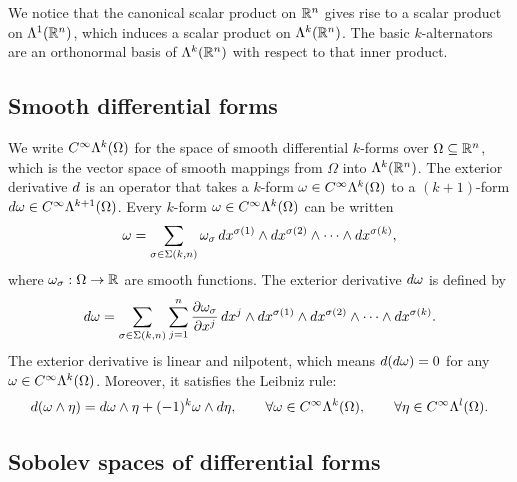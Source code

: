 \documentclass[10pt,a4paper]{article}
\begin{document}
We notice that the canonical scalar product on ${\mathbb R}^{n}$ gives rise to a scalar product on $\Lambda^{1}({\mathbb R}^{n})$,
which induces a scalar product on $\Lambda^{k}({\mathbb R}^{n})$.
The basic $k$-alternators are an orthonormal basis of $\Lambda^{k}({\mathbb R}^{n})$ with respect to that inner product. 

\subsection{Smooth differential forms}

We write $C^{\infty}\Lambda^{k}(\Omega)$ for the space of smooth differential $k$-forms over $\Omega \subseteq {\mathbb R}^{n}$,
which is the vector space of smooth mappings from $\Omega$ into $\Lambda^{k}({\mathbb R}^{n})$.
The exterior derivative \( d \) is an operator that takes a \( k \)-form \( \omega \in C^{\infty}\Lambda^{k}(\Omega) \) 
to a \((k+1)\)-form \( d\omega \in C^{\infty}\Lambda^{k+1}(\Omega) \). 
Every \( k \)-form \( \omega \in C^{\infty}\Lambda^{k}(\Omega) \) can be written 
\begin{gather*}
    \omega = 
    \sum_{ \sigma \in \Sigma(k,n) } 
    \omega_{\sigma} \, 
    dx^{\sigma(1)} \wedge dx^{\sigma(2)} \wedge \cdots \wedge dx^{\sigma(k)},
\end{gather*}
where \( \omega_{\sigma} : \Omega \rightarrow {\mathbb R} \) are smooth functions.
The exterior derivative \( d\omega \) is defined by
\begin{gather*}
    d\omega = 
    \sum_{ \sigma \in \Sigma(k,n) } 
    \sum_{j=1}^{n} 
    \frac{\partial \omega_{\sigma}}{\partial x^j} 
    \, dx^j \wedge 
    dx^{\sigma(1)} \wedge dx^{\sigma(2)} \wedge \cdots \wedge dx^{\sigma(k)}.
\end{gather*}
The exterior derivative is linear and nilpotent, which means 
\( d(d\omega) = 0 \) for any \( \omega \in C^{\infty}\Lambda^{k}(\Omega) \).
Moreover, it satisfies the Leibniz rule:
\begin{gather*} 
    d(\omega \wedge \eta) 
    = 
    d\omega \wedge \eta + (-1)^{k} \omega \wedge d\eta, 
    \qquad \forall \omega \in C^{\infty}\Lambda^{k}(\Omega), 
    \qquad \forall \eta \in C^{\infty}\Lambda^{l}(\Omega).
\end{gather*}

\subsection{Sobolev spaces of differential forms}
\end{document}
